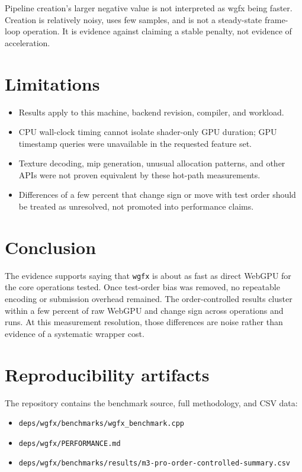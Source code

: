 \documentclass[11pt]{article}
\begin{document}
Pipeline creation's larger negative value is not interpreted as wgfx being
faster. Creation is relatively noisy, uses few samples, and is not a steady-state
frame-loop operation. It is evidence against claiming a stable penalty, not
evidence of acceleration.

\section{Limitations}

\begin{itemize}
  \item Results apply to this machine, backend revision, compiler, and workload.
  \item CPU wall-clock timing cannot isolate shader-only GPU duration; GPU
        timestamp queries were unavailable in the requested feature set.
  \item Texture decoding, mip generation, unusual allocation patterns, and
        other APIs were not proven equivalent by these hot-path measurements.
  \item Differences of a few percent that change sign or move with test order
        should be treated as unresolved, not promoted into performance claims.
\end{itemize}

\section{Conclusion}

The evidence supports saying that \texttt{wgfx} is about as fast as direct
WebGPU for the core operations tested. Once test-order bias was removed, no
repeatable encoding or submission overhead remained. The order-controlled
results cluster within a few percent of raw WebGPU and change sign across
operations and runs. At this measurement resolution, those differences are
noise rather than evidence of a systematic wrapper cost.

\section*{Reproducibility artifacts}

The repository contains the benchmark source, full methodology, and CSV data:

\begin{itemize}
  \item \texttt{deps/wgfx/benchmarks/wgfx\_benchmark.cpp}
  \item \texttt{deps/wgfx/PERFORMANCE.md}
  \item \texttt{deps/wgfx/benchmarks/results/m3-pro-order-controlled-summary.csv}
\end{itemize}
\end{document}
